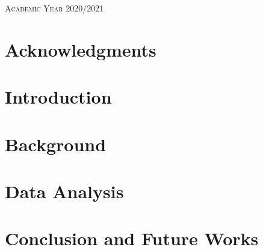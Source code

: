 \documentclass[a4paper,12pt,twoside]{report}
\begin{document}
\begin{onehalfspace}
\begin{titlepage}
\begin{center}
\textsc{Academic Year 2020/2021}\\[0.25cm] %

\vfill

\end{center}
\end{titlepage}

\clearpage
	\fancyhf{}
	\rhead{\thepage}
{}
\chapter*{Acknowledgments}
\label{c:ack}





\clearpage
	\fancyhf{}
	\rhead{\thepage}
	\lhead{\textbf{ \nouppercase{\leftmark}} }
{}
\tableofcontents

\clearpage
{}
{}
\listoffigures

\clearpage
{}
{}
\listoftables


\clearpage
	\fancyhf{}
	\rhead{\thepage}
	\lhead{\nouppercase{\leftmark}}
\chapter{Introduction}
\label{c:intro}




\clearpage
\chapter{Background}
\label{c:background}


\clearpage
\chapter{Data Analysis}
\label{c:data-analysis}




\clearpage
\chapter{Conclusion and Future Works}
\label{c:conclusion}





\end{onehalfspace}
\end{document}
